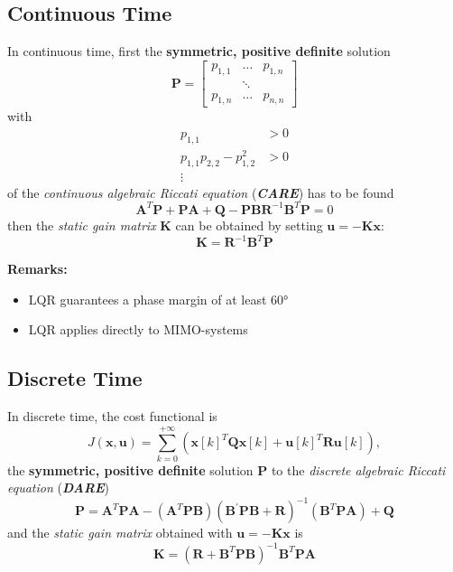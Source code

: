 \subsection{Continuous Time}
In continuous time, first the \textbf{symmetric, positive definite} solution
\begin{equation*}
    \mathbf{P}=\begin{bmatrix} p_{1,1} & \dots  & p_{1,n} \\
                        & \ddots &         \\
                p_{1,n} & \dots  & p_{n,n}
    \end{bmatrix}
\end{equation*}
with
\begin{align*}
    p_{1,1}                   & >0 \\
    p_{1,1}p_{2,2} -p_{1,2}^2 & >0 \\
    \vdots
\end{align*}
of the \textit{continuous algebraic Riccati equation} (\textbf{\textit{CARE}}) has to be found
\noindent\begin{equation*}
    \mathbf{A}^T \mathbf{P}+\mathbf{PA}+\mathbf{Q}-\mathbf{PBR}^{-1}\mathbf{B}^T \mathbf{P}=0
\end{equation*}
then the \textit{static gain matrix} $\mathbf{K}$ can be obtained by setting $\mathbf{u} = -\mathbf{Kx}$:
\noindent\begin{equation*}
    \mathbf{K}=\mathbf{R}^{-1}\mathbf{B}^T \mathbf{P}
\end{equation*}

\textbf{Remarks:}

\begin{itemize}
    \item LQR guarantees a phase margin of at least 60°
    \item LQR applies directly to MIMO-systems
\end{itemize}

\newpar{}
\textbf{} 


\subsection{Discrete Time}
In discrete time, the cost functional is
\noindent\begin{equation*}
    J(\mathbf{x,u})=\sum_{k=0}^{+\infty}\left({\mathbf{x}[k]}^T \mathbf{Qx}[k]+{\mathbf{u}[k]}^T \mathbf{Ru}[k]\right),
\end{equation*}
the \textbf{symmetric, positive definite} solution $\mathbf{P}$ to the \textit{discrete algebraic Riccati equation} (\textbf{\textit{DARE}})
\noindent\begin{equation*}
    \mathbf{P}=\mathbf{A}^T \mathbf{PA}-(\mathbf{A}^T \mathbf{PB}){(\mathbf{B}^{\prime}\mathbf{PB}+\mathbf{R})}^{-1}(\mathbf{B}^T \mathbf{PA})+\mathbf{Q}
\end{equation*}
and the \textit{static gain matrix} obtained with $\mathbf{u} = -\mathbf{Kx}$ is
\noindent\begin{equation*}
    \mathbf{K}={(\mathbf{R}+\mathbf{B}^T \mathbf{PB})}^{-1}\mathbf{B}^T \mathbf{PA}
\end{equation*}

